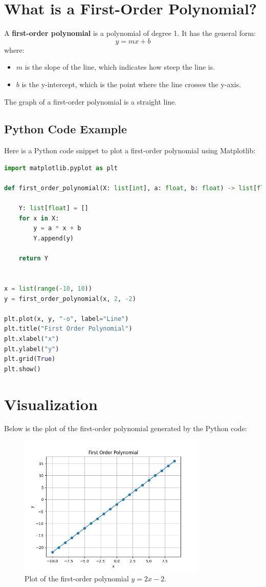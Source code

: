 \section{What is a First-Order Polynomial?}

A \textbf{first-order polynomial} is a polynomial of degree 1. It has the general form:
\[
y = mx + b
\]
where:
\begin{itemize}
    \item \( m \) is the slope of the line, which indicates how steep the line is.
    \item \( b \) is the y-intercept, which is the point where the line crosses the y-axis.
\end{itemize}

The graph of a first-order polynomial is a straight line.

\clearpage
\subsection{Python Code Example}

Here is a Python code snippet to plot a first-order polynomial using Matplotlib:

\begin{lstlisting}[language=Python, caption=Python code to plot a first-order polynomial]
import matplotlib.pyplot as plt

def first_order_polynomial(X: list[int], a: float, b: float) -> list[float]:

    Y: list[float] = []
    for x in X:
        y = a * x + b
        Y.append(y)

    return Y


x = list(range(-10, 10))
y = first_order_polynomial(x, 2, -2)

plt.plot(x, y, "-o", label="Line")
plt.title("First Order Polynomial")
plt.xlabel("x")
plt.ylabel("y")
plt.grid(True)
plt.show()
\end{lstlisting}

\section{Visualization}

Below is the plot of the first-order polynomial generated by the Python code:

\begin{figure}[t]
\centering
\includegraphics[width=0.8\textwidth]{PART3/1_polynomials/line.png}
\caption{Plot of the first-order polynomial $y = 2x - 2$.}
\end{figure}
